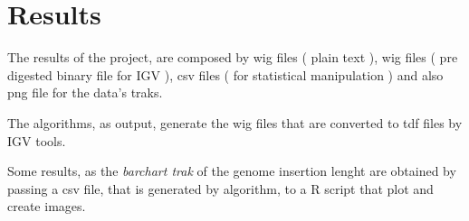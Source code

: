 \section{Results}

The results of the project, are composed by wig files ( plain text ), wig files ( pre digested binary file for IGV ), csv files ( for statistical manipulation ) and also png file for the data's traks.

The algorithms, as output, generate the wig files that are converted to tdf files by IGV tools.

Some results, as the \emph{barchart trak} of the genome insertion lenght are obtained by passing a csv file, that is generated by algorithm, to a R script that plot and create images.